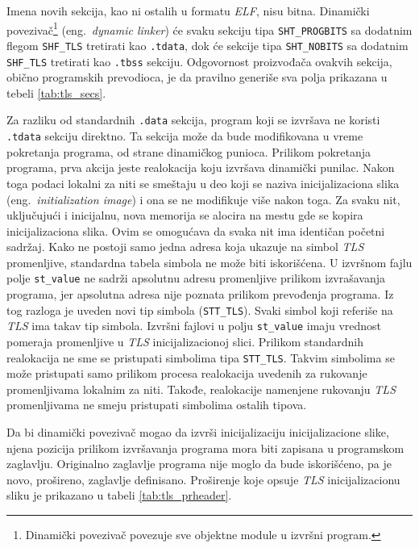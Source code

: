 \documentclass[12pt,oneside]{memoir}
\begin{document}
Imena novih sekcija, kao ni ostalih u formatu \emph{ELF}, nisu bitna. Dinamički povezivač\footnote{Dinamički povezivač povezuje sve objektne module u izvršni program.} (eng.~\emph{dynamic linker}) će svaku sekciju tipa \texttt{SHT\_PROGBITS} sa dodatnim flegom \texttt{SHF\_TLS} tretirati kao \texttt{.tdata}, dok će sekcije tipa \texttt{SHT\_NOBITS} sa dodatnim \texttt{SHF\_TLS} tretirati kao \texttt{.tbss} sekciju. Odgovornost proizvođača ovakvih sekcija, obično programskih prevodioca, je da pravilno generiše sva polja prikazana u tebeli \ref{tab:tls_secs}.

Za razliku od standardnih \texttt{.data} sekcija, program koji se izvršava ne koristi \texttt{.tdata} sekciju direktno.  Ta sekcija može da bude modifikovana u vreme pokretanja programa, od strane dinamičkog punioca. Prilikom pokretanja programa, prva akcija jeste realokacija koju izvršava dinamički punilac. Nakon toga podaci lokalni za niti se smeštaju u deo koji se naziva inicijalizaciona slika (eng.~\emph{initialization image}) i ona se ne modifikuje više nakon toga. Za svaku nit, uključujući i inicijalnu, nova memorija se alocira na mestu gde se kopira inicijalizaciona slika. Ovim se omogućava da svaka nit ima identičan početni sadržaj. Kako ne postoji samo jedna adresa koja ukazuje na simbol \emph{TLS} promenljive, standardna tabela simbola ne može biti iskorišćena. U izvršnom fajlu polje \texttt{st\_value} ne sadrži apsolutnu adresu promenljive prilikom izvrašavanja programa, jer apsolutna adresa nije poznata prilikom prevođenja programa. Iz tog razloga  je uveden novi tip simbola (\texttt{STT\_TLS}). Svaki simbol koji referiše na \emph{TLS} ima takav tip simbola. Izvršni fajlovi u polju \texttt{st\_value} imaju vrednost pomeraja promenljive u \emph{TLS} inicijalizacionoj slici.
Prilikom standardnih realokacija ne sme se pristupati simbolima tipa \texttt{STT\_TLS}. Takvim simbolima se može pristupati samo prilikom procesa realokacija uvedenih za rukovanje promenljivama lokalnim za niti. Takođe, realokacije namenjene rukovanju \emph{TLS} promenljivama ne smeju pristupati simbolima ostalih tipova.

Da bi dinamički povezivač mogao da izvrši inicijalizaciju inicijalizacione slike, njena pozicija prilikom izvršavanja programa mora biti zapisana u programskom zaglavlju. Originalno zaglavlje programa nije moglo da bude iskorišćeno, pa je novo, prošireno, zaglavlje definisano. Proširenje koje opsuje \emph{TLS} inicijalizacionu sliku je prikazano u tabeli \ref{tab:tls_prheader}.
\end{document}
